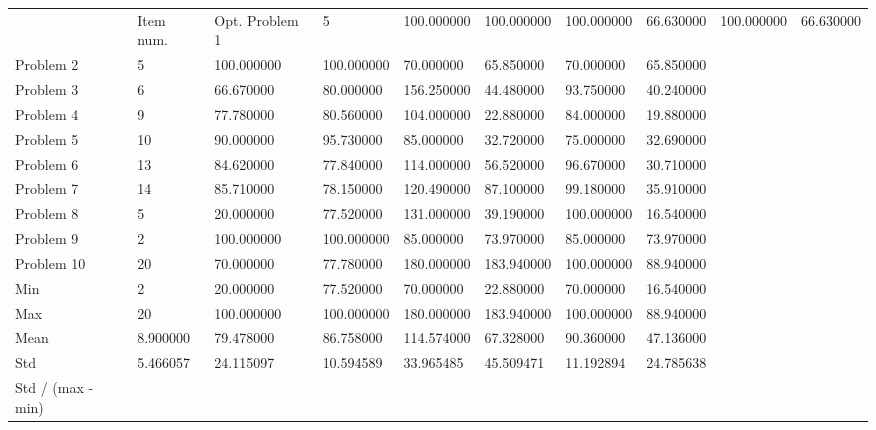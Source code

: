 \begin{tabular}{llllllll}
\toprule
 & Item num. & Opt. %
\midrule
Problem 1 & 5 & 100.000000 & 100.000000 & 100.000000 & 66.630000 & 100.000000 & 66.630000 \\
Problem 2 & 5 & 100.000000 & 100.000000 & 70.000000 & 65.850000 & 70.000000 & 65.850000 \\
Problem 3 & 6 & 66.670000 & 80.000000 & 156.250000 & 44.480000 & 93.750000 & 40.240000 \\
Problem 4 & 9 & 77.780000 & 80.560000 & 104.000000 & 22.880000 & 84.000000 & 19.880000 \\
Problem 5 & 10 & 90.000000 & 95.730000 & 85.000000 & 32.720000 & 75.000000 & 32.690000 \\
Problem 6 & 13 & 84.620000 & 77.840000 & 114.000000 & 56.520000 & 96.670000 & 30.710000 \\
Problem 7 & 14 & 85.710000 & 78.150000 & 120.490000 & 87.100000 & 99.180000 & 35.910000 \\
Problem 8 & 5 & 20.000000 & 77.520000 & 131.000000 & 39.190000 & 100.000000 & 16.540000 \\
Problem 9 & 2 & 100.000000 & 100.000000 & 85.000000 & 73.970000 & 85.000000 & 73.970000 \\
Problem 10 & 20 & 70.000000 & 77.780000 & 180.000000 & 183.940000 & 100.000000 & 88.940000 \\
Min & 2 & 20.000000 & 77.520000 & 70.000000 & 22.880000 & 70.000000 & 16.540000 \\
Max & 20 & 100.000000 & 100.000000 & 180.000000 & 183.940000 & 100.000000 & 88.940000 \\
Mean & 8.900000 & 79.478000 & 86.758000 & 114.574000 & 67.328000 & 90.360000 & 47.136000 \\
Std & 5.466057 & 24.115097 & 10.594589 & 33.965485 & 45.509471 & 11.192894 & 24.785638 \\
Std / (max - min) %
\bottomrule
\end{tabular}
